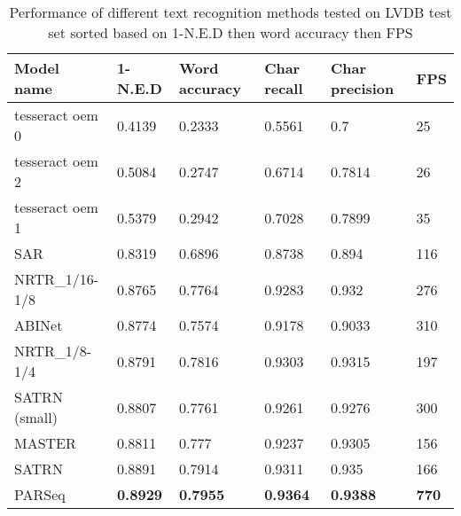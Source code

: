 \begin{table}[!ht]
    \centering
    \caption{Performance of different text recognition methods tested on LVDB test set sorted based on 1-N.E.D then word accuracy then FPS}
    \begin{tabular}{|l|l|l|l|l|l|}
    \hline
        Model name & 1-N.E.D & Word accuracy & Char recall & Char precision & FPS \\ \hline
        tesseract oem 0 & 0.4139 & 0.2333 & 0.5561 & 0.7 & 25 \\ \hline
        tesseract oem 2 & 0.5084 & 0.2747 & 0.6714 & 0.7814 & 26 \\ \hline
        tesseract oem 1 & 0.5379 & 0.2942 & 0.7028 & 0.7899 & 35 \\ \hline
        SAR & 0.8319 & 0.6896 & 0.8738 & 0.894 & 116 \\ \hline
        NRTR\_1/16-1/8 & 0.8765 & 0.7764 & 0.9283 & 0.932 & 276 \\ \hline
        ABINet & 0.8774 & 0.7574 & 0.9178 & 0.9033 & 310 \\ \hline
        NRTR\_1/8-1/4 & 0.8791 & 0.7816 & 0.9303 & 0.9315 & 197 \\ \hline
        SATRN (small) & 0.8807 & 0.7761 & 0.9261 & 0.9276 & 300 \\ \hline
        MASTER & 0.8811 & 0.777 & 0.9237 & 0.9305 & 156 \\ \hline
        SATRN & 0.8891 & 0.7914 & 0.9311 & 0.935 & 166 \\ \hline
        PARSeq & \textbf{0.8929} & \textbf{0.7955} & \textbf{0.9364} & \textbf{0.9388} & \textbf{770} \\ \hline
    \end{tabular}
    \label{tab:text_rec_results}
\end{table}